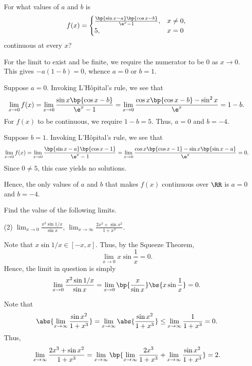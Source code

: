 \begin{problem}
    For what values of $a$ and $b$ is \[f(x) = \begin{cases}
        \frac{\bp{\sin x - a}\bp{\cos x - b}}{\e^x - 1}, & x \neq 0,\\
        5, & x = 0
    \end{cases}\] continuous at every $x$?
\end{problem}
\begin{ppart}
    For the limit to exist and be finite, we require the numerator to be 0 as $x \to 0$. This gives $-a(1-b) = 0$, whence $a = 0$ or $b = 1$.

     Suppose $a = 0$. Invoking L'H\^{o}pital's rule, we see that \[\lim_{x \to 0} f(x) = \lim_{x \to 0} \frac{\sin x\bp{\cos x - b}}{\e^x - 1} = \lim_{x \to 0} \frac{\cos x \bp{\cos x - b} - \sin^2 x}{\e^x} = 1 - b.\] For $f(x)$ to be continuous, we require $1-b = 5$. Thus, $a = 0$ and $b = -4$.

     Suppose $b = 1$. Invoking L'H\^{o}pital's rule, we see that \[\lim_{x \to 0} f(x) = \lim_{x \to 0} \frac{\bp{\sin x - a}\bp{\cos x - 1}}{\e^x - 1} = \lim_{x \to 0} \frac{\cos x \bp{\cos x - 1} -\sin x\bp{\sin x - a}}{\e^x} = 0.\] Since $0 \neq 5$, this case yields no solutions.

    Hence, the only values of $a$ and $b$ that makes $f(x)$ continuous over $\RR$ is $a = 0$ and $b = -4$.
\end{ppart}

\begin{problem}
    Find the value of the following limits.

    \begin{tasks}(2)
        \task $\displaystyle\lim_{x \to 0} \frac{x^2 \sin{1/x}}{\sin x}$,
        \task $\displaystyle\lim_{x \to \infty} \frac{2x^3 + \sin{x^2}}{1 + x^3}$.
    \end{tasks}
\end{problem}
\begin{solution}
    \begin{ppart}
        Note that $x\sin{1/x} \in [-x, x]$. Thus, by the Squeeze Theorem, \[\lim_{x \to 0} x\sin{\frac1x} = 0.\] Hence, the limit in question is simply \[\lim_{x \to 0} \frac{x^2 \sin{1/x}}{\sin x} = \lim_{x \to 0} \bp{\frac{x}{\sin x}} \bs{x\sin{\frac1x}} = 0.\]
    \end{ppart}
    \begin{ppart}
        Note that \[\abs{\lim_{x \to \infty} \frac{\sin{x^2}}{1 + x^3}} = \lim_{x \to \infty} \abs{\frac{\sin{x^2}}{1 + x^3}} \leq \lim_{x \to \infty} \frac{1}{1 + x^3} = 0.\] Thus, \[\lim_{x \to \infty} \frac{2x^3 + \sin{x^2}}{1 + x^3} = \lim_{x \to \infty} \bp{\lim_{x \to \infty} \frac{2x^3}{1 + x^3} + \lim_{x \to \infty} \frac{\sin{x^2}}{1 + x^3}} = 2.\]
    \end{ppart}
\end{solution}

